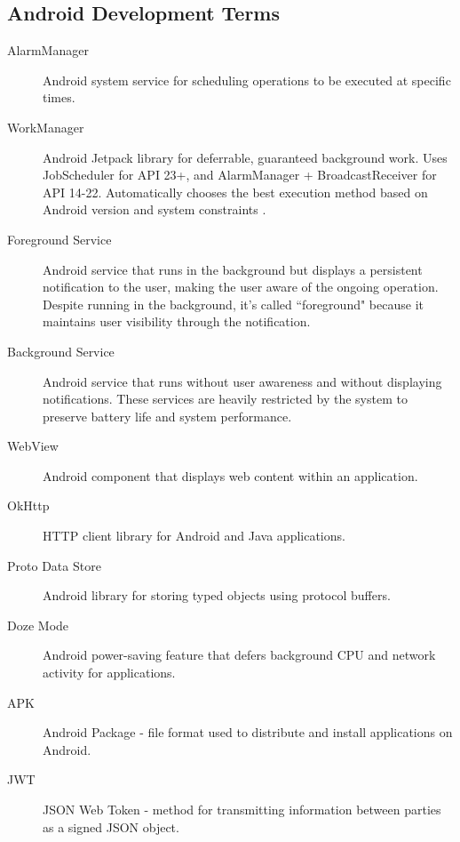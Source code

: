 \subsection{Android Development Terms}

\begin{description}
    \item[AlarmManager] Android system service for scheduling operations to be executed at specific times.
    
    \item[WorkManager] Android Jetpack library for deferrable, guaranteed background work. Uses JobScheduler for API 23+, and AlarmManager + BroadcastReceiver for API 14-22. Automatically chooses the best execution method based on Android version and system constraints \cite{android-workmanager}.
    
    \item[Foreground Service] Android service that runs in the background but displays a persistent notification to the user, making the user aware of the ongoing operation. Despite running in the background, it's called ``foreground" because it maintains user visibility through the notification.
    
    \item[Background Service] Android service that runs without user awareness and without displaying notifications. These services are heavily restricted by the system to preserve battery life and system performance.
    
    \item[WebView] Android component that displays web content within an application.
    
    \item[OkHttp] HTTP client library for Android and Java applications.
    
    \item[Proto Data Store] Android library for storing typed objects using protocol buffers.
    
    \item[Doze Mode] Android power-saving feature that defers background CPU and network activity for applications.
    
    \item[APK] Android Package - file format used to distribute and install applications on Android.
    
    \item[JWT] JSON Web Token - method for transmitting information between parties as a signed JSON object.
\end{description}

